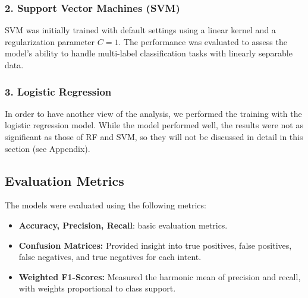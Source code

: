         \subsubsection*{2. Support Vector Machines (SVM) \\}
        
        
            SVM was initially trained with default settings using a linear kernel and a regularization parameter \( C = 1 \). The performance was evaluated to assess the model's ability to handle multi-label classification tasks with linearly separable data.

        \subsubsection*{3. Logistic Regression \\}
        
        
            In order to have another view of the analysis, we performed the training with the logistic regression model. While the model performed well, the results were not as significant as those of RF and SVM, so they will not be discussed in detail in this section (see Appendix).

    \subsection{Evaluation Metrics}
    
        The models were evaluated using the following metrics:
        
        \begin{itemize}
        
            \item \textbf{Accuracy, Precision, Recall}: basic evaluation metrics.
            
            \item \textbf{Confusion Matrices:} Provided insight into true positives, false positives, false negatives, and true negatives for each intent.
            
            \item \textbf{Weighted F1-Scores:} Measured the harmonic mean of precision and recall, with weights proportional to class support.
        
        \end{itemize}

